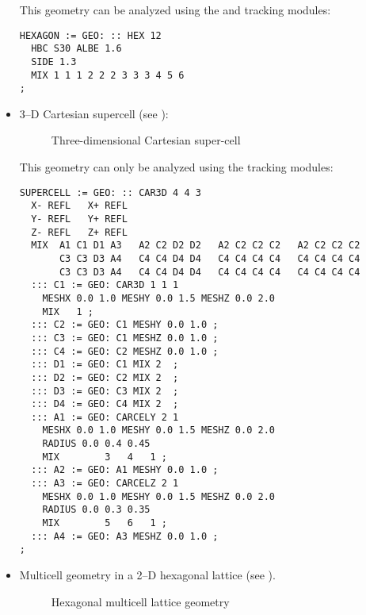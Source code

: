 \begin{itemize}
This geometry can be analyzed using the  and
 tracking modules:

\begin{verbatim}
HEXAGON := GEO: :: HEX 12
  HBC S30 ALBE 1.6
  SIDE 1.3
  MIX 1 1 1 2 2 2 3 3 3 4 5 6 
;
\end{verbatim}

\item 3--D Cartesian supercell (see ):

\begin{figure}[h!] 
\begin{center} 
\epsfxsize=10cm \centerline{ }
\parbox{14cm}{\caption{Three-dimensional Cartesian
super-cell}\label{fig:supercel}}     \end{center}  
\end{figure}

This geometry can only be analyzed using the 
 tracking modules:

\begin{verbatim}
SUPERCELL := GEO: :: CAR3D 4 4 3
  X- REFL   X+ REFL
  Y- REFL   Y+ REFL
  Z- REFL   Z+ REFL
  MIX  A1 C1 D1 A3   A2 C2 D2 D2   A2 C2 C2 C2   A2 C2 C2 C2
       C3 C3 D3 A4   C4 C4 D4 D4   C4 C4 C4 C4   C4 C4 C4 C4
       C3 C3 D3 A4   C4 C4 D4 D4   C4 C4 C4 C4   C4 C4 C4 C4 
  ::: C1 := GEO: CAR3D 1 1 1
    MESHX 0.0 1.0 MESHY 0.0 1.5 MESHZ 0.0 2.0
    MIX   1 ;
  ::: C2 := GEO: C1 MESHY 0.0 1.0 ;
  ::: C3 := GEO: C1 MESHZ 0.0 1.0 ;
  ::: C4 := GEO: C2 MESHZ 0.0 1.0 ;
  ::: D1 := GEO: C1 MIX 2  ;
  ::: D2 := GEO: C2 MIX 2  ;
  ::: D3 := GEO: C3 MIX 2  ;
  ::: D4 := GEO: C4 MIX 2  ;
  ::: A1 := GEO: CARCELY 2 1
    MESHX 0.0 1.0 MESHY 0.0 1.5 MESHZ 0.0 2.0
    RADIUS 0.0 0.4 0.45
    MIX        3   4   1 ;
  ::: A2 := GEO: A1 MESHY 0.0 1.0 ;
  ::: A3 := GEO: CARCELZ 2 1
    MESHX 0.0 1.0 MESHY 0.0 1.5 MESHZ 0.0 2.0
    RADIUS 0.0 0.3 0.35
    MIX        5   6   1 ;
  ::: A4 := GEO: A3 MESHZ 0.0 1.0 ;
;
\end{verbatim}


\item Multicell geometry in a 2--D hexagonal lattice (see ).

\begin{figure}[h!] 
\begin{center} 
\epsfxsize=14cm \centerline{ }
\parbox{14cm}{\caption{Hexagonal multicell lattice geometry}
\label{fig:multihex}}    
\end{center}  
\end{figure}


\end{itemize}
